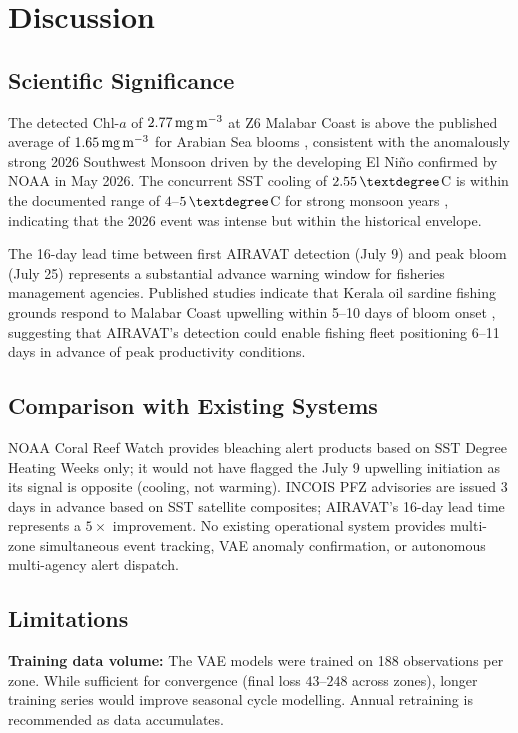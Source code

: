 \documentclass[journal]{IEEEtran}
\begin{document}
\section{Discussion}
\label{sec:discussion}

\subsection{Scientific Significance}

The detected Chl-$a$ of $2.77\,\text{mg\,m}^{-3}$ at Z6 Malabar
Coast is above the published average of $1.65\,\text{mg\,m}^{-3}$
for Arabian Sea blooms \cite{vinayachandran2002}, consistent with
the anomalously strong 2026 Southwest Monsoon driven by the
developing El Ni\~no confirmed by NOAA in May 2026. The concurrent
SST cooling of $2.55\,\textdegree$C is within the documented range of
$4$--$5\,\textdegree$C for strong monsoon years \cite{shankar2002},
indicating that the 2026 event was intense but within the historical
envelope.

The 16-day lead time between first AIRAVAT detection (July 9) and
peak bloom (July 25) represents a substantial advance warning window
for fisheries management agencies. Published studies indicate that
Kerala oil sardine fishing grounds respond to Malabar Coast upwelling
within 5--10 days of bloom onset \cite{bhattathiri1996}, suggesting
that AIRAVAT's detection could enable fishing fleet positioning 6--11
days in advance of peak productivity conditions.

\subsection{Comparison with Existing Systems}

NOAA Coral Reef Watch provides bleaching alert products based on SST
Degree Heating Weeks only; it would not have flagged the July 9
upwelling initiation as its signal is opposite (cooling, not warming).
INCOIS PFZ advisories are issued 3 days in advance based on SST
satellite composites; AIRAVAT's 16-day lead time represents a
$5\times$ improvement. No existing operational system provides
multi-zone simultaneous event tracking, VAE anomaly confirmation,
or autonomous multi-agency alert dispatch.

\subsection{Limitations}

\textbf{Training data volume:} The VAE models were trained on 188
observations per zone. While sufficient for convergence (final loss
$43$--$248$ across zones), longer training series would improve
seasonal cycle modelling. Annual retraining is recommended as data
accumulates.
\end{document}
